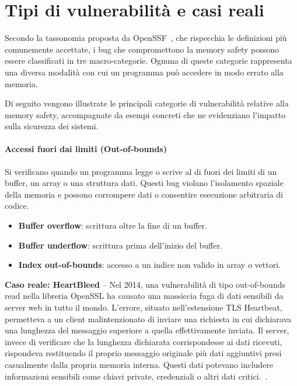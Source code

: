   \section{Tipi di vulnerabilità e casi reali}
  \label{sec:vulnerability_types}

  Secondo la tassonomia proposta da OpenSSF~\cite{memory_safety_continuum_definition},
  che rispecchia le definizioni più comunemente accettate, i bug che compromettono
  la memory safety possono essere classificati in tre macro-categorie. Ognuna di
  queste categorie rappresenta una diversa modalità con cui un programma può
  accedere in modo errato alla memoria.

  Di seguito vengono illustrate le principali categorie di vulnerabilità relative
  alla memory safety, accompagnate da esempi concreti che ne evidenziano l'impatto
  sulla sicurezza dei sistemi.

  \paragraph{Accessi fuori dai limiti (Out-of-bounds)}
  \label{sec:oob}

  Si verificano quando un programma legge o scrive al di fuori dei limiti di un buffer,
  un array o una struttura dati. Questi bug violano l'isolamento spaziale della memoria
  e possono corrompere dati o consentire esecuzione arbitraria di codice.

  \begin{itemize}
    \item \textbf{Buffer overflow}: scrittura oltre la fine di un buffer.

    \item \textbf{Buffer underflow}: scrittura prima dell'inizio del buffer.

    \item \textbf{Index out-of-bounds}: accesso a un indice non valido in array o vettori.
  \end{itemize}

  \textbf{Caso reale: HeartBleed} -- Nel 2014, una vulnerabilità di tipo out-of-bounds
  read nella libreria OpenSSL ha causato una massiccia fuga di dati sensibili da server
  web in tutto il mondo. L'errore, situato nell'estensione TLS Heartbeat,
  permetteva a un client malintenzionato di inviare una richiesta in cui
  dichiarava una lunghezza del messaggio superiore a quella effettivamente inviata.
  Il server, invece di verificare che la lunghezza dichiarata corrispondesse ai
  dati ricevuti, rispondeva restituendo il proprio messaggio originale più dati aggiuntivi
  presi casualmente dalla propria memoria interna. Questi dati potevano includere
  informazioni sensibili come chiavi private, credenziali o altri dati critici.~\cite{heartbleed}.

